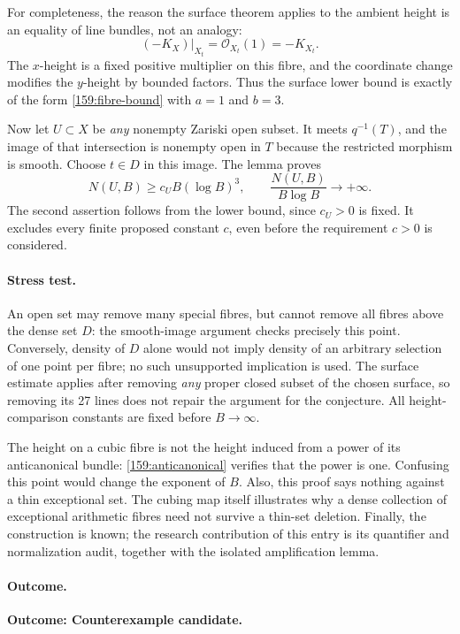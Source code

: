 \documentclass[11pt,a4paper]{article}
\numberwithin{equation}{section}
\begin{document}
For completeness, the reason the surface theorem applies to the ambient
height is an equality of line bundles, not an analogy:
\[
 (-K_X)|_{X_t}=\mathcal O_{X_t}(1)=-K_{X_t}.
\]
The $x$-height is a fixed positive multiplier on this fibre, and the
coordinate change modifies the $y$-height by bounded factors. Thus the
surface lower bound is exactly of the form \eqref{159:fibre-bound} with
$a=1$ and $b=3$.

Now let $U\subset X$ be \emph{any} nonempty Zariski open subset. It meets
$q^{-1}(T)$, and the image of that intersection is nonempty open in $T$
because the restricted morphism is smooth. Choose $t\in D$ in this
image. The lemma proves
\begin{equation}\label{159:contradiction}
 N(U,B)\ge c_U B(\log B)^3,
 \qquad
 \frac{N(U,B)}{B\log B}\longrightarrow+\infty.
\end{equation}
The second assertion follows from the lower bound, since $c_U>0$ is fixed.
It excludes every finite proposed constant $c$, even before the requirement
$c>0$ is considered.

\paragraph{Stress test.}
An open set may remove many special fibres, but cannot remove all fibres
above the dense set $D$: the smooth-image argument checks precisely this
point. Conversely, density of $D$ alone would not imply density of an
arbitrary selection of one point per fibre; no such unsupported implication
is used. The surface estimate applies after removing \emph{any} proper
closed subset of the chosen surface, so removing its 27 lines does not
repair the argument for the conjecture. All height-comparison constants
are fixed before $B\to\infty$.

The height on a cubic fibre is not the height induced from a power of its
anticanonical bundle: \eqref{159:anticanonical} verifies that the power is
one. Confusing this point would change the exponent of $B$. Also, this
proof says nothing against a thin exceptional set. The cubing map itself
illustrates why a dense collection of exceptional arithmetic fibres need
not survive a thin-set deletion. Finally, the construction is known; the
research contribution of this entry is its quantifier and normalization
audit, together with the isolated amplification lemma.

\paragraph{Outcome.}
\textbf{Outcome: Counterexample candidate.}
\end{document}
